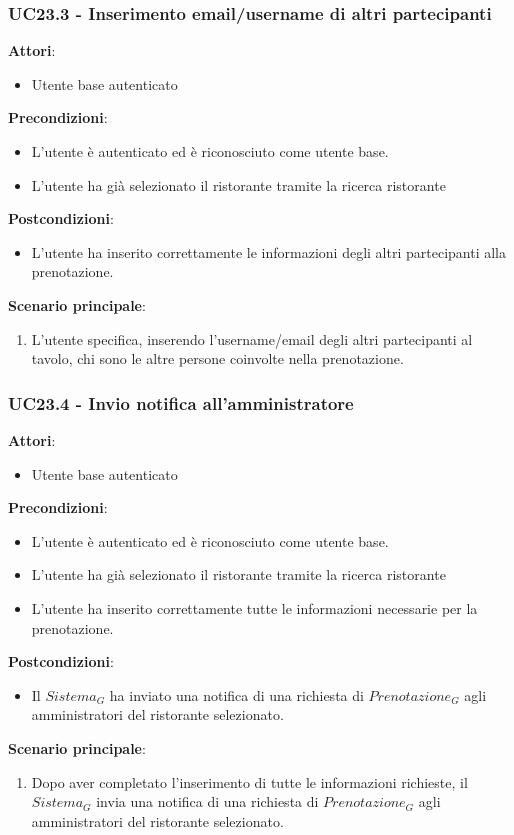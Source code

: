 \subsubsection{UC23.3 - Inserimento email/username di altri partecipanti}\label{usecase:23_3}
\textbf{Attori}:
\begin{itemize}
    \item Utente base autenticato
\end{itemize}
\textbf{Precondizioni}:
\begin{itemize}
    \item L'utente è autenticato ed è riconosciuto come utente base.
    \item L'utente ha già selezionato il ristorante tramite la ricerca ristorante 
\end{itemize}
\textbf{Postcondizioni}:
\begin{itemize}
    \item L'utente ha inserito correttamente le informazioni degli altri partecipanti alla prenotazione.
\end{itemize}
\textbf{Scenario principale}:
\begin{enumerate}
    \item L'utente specifica, inserendo l'username/email degli altri partecipanti al tavolo, chi sono le altre persone coinvolte nella prenotazione.
\end{enumerate}


\subsubsection{UC23.4 - Invio notifica all'amministratore
}\label{usecase:23_4}
\textbf{Attori}:
\begin{itemize}
    \item Utente base autenticato
\end{itemize}
\textbf{Precondizioni}:
\begin{itemize}
    \item L'utente è autenticato ed è riconosciuto come utente base.
    \item L'utente ha già selezionato il ristorante tramite la ricerca ristorante 
    \item L'utente ha inserito correttamente tutte le informazioni necessarie per la prenotazione.
\end{itemize}
\textbf{Postcondizioni}:
\begin{itemize}
    \item Il $\textit{Sistema}_G$ ha inviato una notifica di una richiesta di $\textit{Prenotazione}_G$ agli amministratori del ristorante selezionato.
\end{itemize}
\textbf{Scenario principale}:
\begin{enumerate}
    \item Dopo aver completato l'inserimento di tutte le informazioni richieste, il $\textit{Sistema}_G$ invia una notifica di una richiesta di $\textit{Prenotazione}_G$ agli amministratori del ristorante selezionato.
\end{enumerate}



\newpage